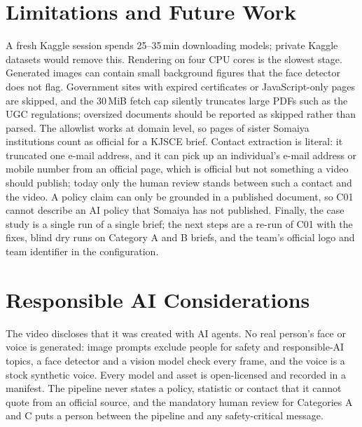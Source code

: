 \documentclass[twoside,11pt]{article}
\begin{document}
\section{Limitations and Future Work}

A fresh Kaggle session spends 25--35\,min downloading models; private Kaggle datasets would remove this. Rendering on four CPU cores is the slowest stage. Generated images can contain small background figures that the face detector does not flag. Government sites with expired certificates or JavaScript-only pages are skipped, and the 30\,MiB fetch cap silently truncates large PDFs such as the UGC regulations; oversized documents should be reported as skipped rather than parsed. The allowlist works at domain level, so pages of sister Somaiya institutions count as official for a KJSCE brief. Contact extraction is literal: it truncated one e-mail address, and it can pick up an individual's e-mail address or mobile number from an official page, which is official but not something a video should publish; today only the human review stands between such a contact and the video. A policy claim can only be grounded in a published document, so C01 cannot describe an AI policy that Somaiya has not published. Finally, the case study is a single run of a single brief; the next steps are a re-run of C01 with the fixes, blind dry runs on Category A and B briefs, and the team's official logo and team identifier in the configuration.

\section{Responsible AI Considerations}

The video discloses that it was created with AI agents. No real person's face or voice is generated: image prompts exclude people for safety and responsible-AI topics, a face detector and a vision model check every frame, and the voice is a stock synthetic voice. Every model and asset is open-licensed and recorded in a manifest. The pipeline never states a policy, statistic or contact that it cannot quote from an official source, and the mandatory human review for Categories A and C puts a person between the pipeline and any safety-critical message.



\end{document}
